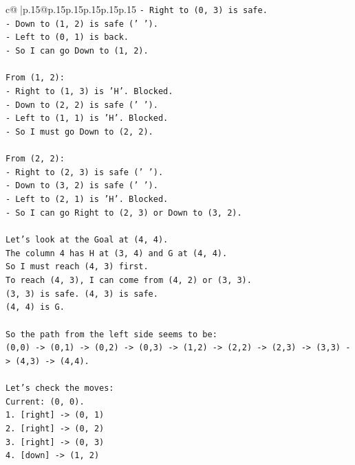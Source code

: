 \documentclass{article}
\begin{document}
{\begin{supertabular}{c@{$\;$}|p{.15\linewidth}@{}p{.15\linewidth}p{.15\linewidth}p{.15\linewidth}p{.15\linewidth}p{.15\linewidth}}
{{{\texttt{{-} Right to (0, 3) is safe.} \\
\texttt{{-} Down to (1, 2) is safe (' ').} \\
\texttt{{-} Left to (0, 1) is back.} \\
\texttt{{-} So I can go Down to (1, 2).} \\
\\ 
\texttt{From (1, 2):} \\
\texttt{{-} Right to (1, 3) is 'H'. Blocked.} \\
\texttt{{-} Down to (2, 2) is safe (' ').} \\
\texttt{{-} Left to (1, 1) is 'H'. Blocked.} \\
\texttt{{-} So I must go Down to (2, 2).} \\
\\ 
\texttt{From (2, 2):} \\
\texttt{{-} Right to (2, 3) is safe (' ').} \\
\texttt{{-} Down to (3, 2) is safe (' ').} \\
\texttt{{-} Left to (2, 1) is 'H'. Blocked.} \\
\texttt{{-} So I can go Right to (2, 3) or Down to (3, 2).} \\
\\ 
\texttt{Let's look at the Goal at (4, 4).} \\
\texttt{The column 4 has H at (3, 4) and G at (4, 4).} \\
\texttt{So I must reach (4, 3) first.} \\
\texttt{To reach (4, 3), I can come from (4, 2) or (3, 3).} \\
\texttt{(3, 3) is safe. (4, 3) is safe.} \\
\texttt{(4, 4) is G.} \\
\\ 
\texttt{So the path from the left side seems to be:} \\
\texttt{(0,0) {-}> (0,1) {-}> (0,2) {-}> (0,3) {-}> (1,2) {-}> (2,2) {-}> (2,3) {-}> (3,3) {-}> (4,3) {-}> (4,4).} \\
\\ 
\texttt{Let's check the moves:} \\
\texttt{Current: (0, 0).} \\
\texttt{1. {[}right{]} {-}> (0, 1)} \\
\texttt{2. {[}right{]} {-}> (0, 2)} \\
\texttt{3. {[}right{]} {-}> (0, 3)} \\
\texttt{4. {[}down{]} {-}> (1, 2)} \\
}}}
\end{supertabular}}
\end{document}

